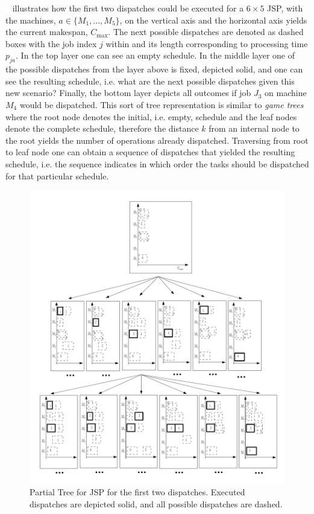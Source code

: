 \documentclass[letterpaper]{article}
\begin{document}
~ illustrates how the first two dispatches could be executed for a $6\times 5$ JSP, with the machines, $a\in\{M_1,...,M_5\}$, on the vertical axis and the horizontal axis yields the current makespan, $C_{\max}$. The next possible dispatches are denoted as dashed boxes with the job index $j$ within and its length corresponding to processing time $p_{ja}$.
In the top layer one can see an empty schedule.
In the middle layer one of the possible dispatches from the layer above is fixed, depicted solid, and one can see the resulting 
schedule, i.e. what are the next possible dispatches given this new scenario? Finally, the bottom layer depicts all outcomes if job $J_3$ on machine $M_4$ would be dispatched. 
This sort of tree representation is similar 
to \emph{game trees} \cite{vonNeumann44} where the root node denotes the initial, i.e. empty, schedule and the leaf nodes 
denote the complete schedule, therefore the distance $k$ from an internal node to the root yields the number of 
operations already dispatched. Traversing from root to leaf node one can obtain a sequence of dispatches that yielded 
the resulting schedule, i.e. the sequence indicates in which order the tasks should be dispatched for that particular 
schedule. 

\begin{figure}[t!]
\includegraphics[width=\columnwidth]{figures/gametree}
\caption[Partial Game Tree for JSP]{Partial Tree for JSP for the first two dispatches. 
Executed dispatches are depicted solid, and all possible dispatches are dashed.}
\label{fig:jssp:gametree}
\end{figure}
\end{document}
